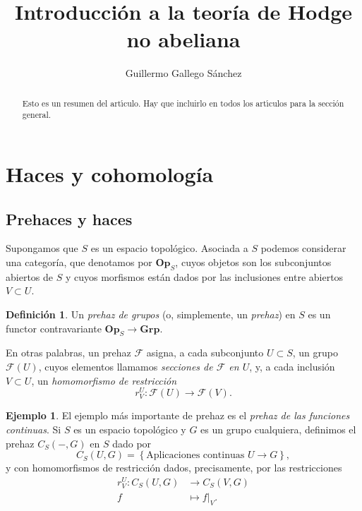 \documentclass[autocontact]{gaceta}
\title{Introducción a la teoría de Hodge no abeliana}
\author{Guillermo Gallego Sánchez}
\theoremstyle{definition} \newtheorem{defn}[thm]{Definición}
\theoremstyle{definition} \newtheorem{ejemplo}[thm]{Ejemplo}
\theoremstyle{definition} \newtheorem{ejercicio}[thm]{Ejercicio}
\def\FF{\mathscr{F}}
\def\Op{\mathbf{Op}}
\begin{document}

\maketitle

\begin{abstract}
Esto es un resumen del art\'{\i}culo. Hay que incluirlo en todos los art\'{\i}culos para la secci\'on general.
\end{abstract}




\section{Haces y cohomología}
\subsection{Prehaces y haces}
Supongamos que $S$ es un espacio topológico. Asociada a $S$ podemos considerar una categoría, que denotamos por $\Op_S$, cuyos objetos son los subconjuntos abiertos de $S$ y cuyos morfismos están dados por las inclusiones entre abiertos $V\subset U$.

\begin{defn}
  Un \emph{prehaz de grupos} (o, simplemente, un \emph{prehaz}) en $S$ es un functor contravariante $\Op_S \rightarrow \mathbf{Grp}$.
\end{defn}

En otras palabras, un prehaz $\FF$ asigna, a cada subconjunto $U\subset S$, un grupo $\FF(U)$, cuyos elementos llamamos \emph{secciones de $\FF$ en $U$}, y, a cada inclusión $V\subset U$, un \emph{homomorfismo de restricción} $$r^U_V:\FF(U) \rightarrow \FF(V).$$

\begin{ejemplo}
El ejemplo más importante de prehaz es el \emph{prehaz de las funciones continuas}. Si $S$ es un espacio topológico y $G$ es un grupo cualquiera, definimos el prehaz $C_S(-,G)$ en $S$ dado por
\begin{equation*}
  C_S(U,G) = \left\{ \text{Aplicaciones continuas } U\rightarrow G \right\},
\end{equation*}
y con homomorfismos de restricción dados, precisamente, por las restricciones
\begin{align*}
  r^U_V :C_S(U,G) &\longrightarrow C_S(V,G)\\ 
    f &\longmapsto f|_V. 
  \end{align*}
\end{ejemplo}
\end{document}
